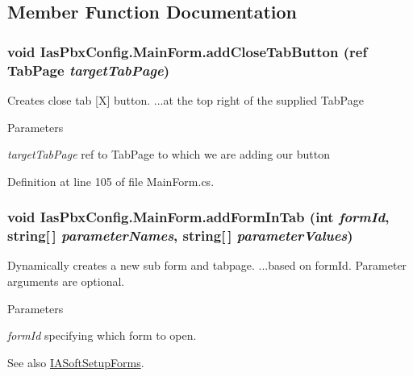 \subsection{Member Function Documentation}
\hypertarget{class_ias_pbx_config_1_1_main_form_a11921883e13c19ffd3fad9d1de8f897a}{
\subsubsection[{addCloseTabButton}]{\setlength{\rightskip}{0pt plus 5cm}void IasPbxConfig.MainForm.addCloseTabButton (ref TabPage {\em targetTabPage})}}
\label{class_ias_pbx_config_1_1_main_form_a11921883e13c19ffd3fad9d1de8f897a}


Creates close tab \mbox{[}X\mbox{]} button. ...at the top right of the supplied TabPage 
\begin{DoxyParams}{Parameters}
\item[{\em targetTabPage}]ref to TabPage to which we are adding our button \end{DoxyParams}


Definition at line 105 of file MainForm.cs.\hypertarget{class_ias_pbx_config_1_1_main_form_a1fde9e37db17057ab571cb0c15093fd3}{
\subsubsection[{addFormInTab}]{\setlength{\rightskip}{0pt plus 5cm}void IasPbxConfig.MainForm.addFormInTab (int {\em formId}, \/  string\mbox{[}$\,$\mbox{]} {\em parameterNames}, \/  string\mbox{[}$\,$\mbox{]} {\em parameterValues})}}
\label{class_ias_pbx_config_1_1_main_form_a1fde9e37db17057ab571cb0c15093fd3}


Dynamically creates a new sub form and tabpage. ...based on formId. Parameter arguments are optional. 
\begin{DoxyParams}{Parameters}
\item[{\em formId}]specifying which form to open. \end{DoxyParams}
\begin{DoxySeeAlso}{See also}
\hyperlink{namespace_ias_pbx_config_a3304277b6c0e85a58951234034da7f3b}{IASoftSetupForms}. 
\end{DoxySeeAlso}


